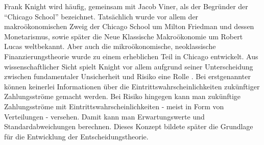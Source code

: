 Frank Knight wird häufig, gemeinsam mit Jacob Viner, als der Begründer der "`Chicago School"' bezeichnet. Tatsächlich wurde vor allem der makroökonomischen Zweig der Chicago School um Milton Friedman und dessen Monetarismus, sowie später die Neue Klassische Makroökonomie um Robert Lucas weltbekannt. Aber auch die mikroökonomische, neoklassische Finanzierungstheorie wurde zu einem erheblichen Teil in Chicago entwickelt. Aus wissenschaftlicher Sicht spielt Knight vor allem aufgrund seiner Unterscheidung zwischen fundamentaler Unsicherheit und Risiko eine Rolle \parencite{Knight1921}. Bei erstgenannter können keinerlei Informationen über die Eintrittswahrscheinlichkeiten zukünftiger Zahlungsströme gemacht werden. Bei Risiko hingegen kann man zukünftige Zahlungsströme mit Eintrittswahrscheinlichkeiten - meist in Form von Verteilungen - versehen. Damit kann man Erwartungswerte und Standardabweichungen berechnen. Dieses Konzept bildete später die Grundlage für die Entwicklung der Entscheidungstheorie.

